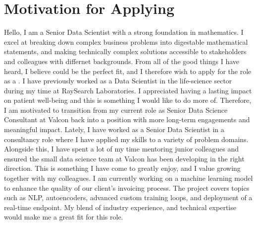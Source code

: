 \section{Motivation for Applying}
Hello, I am a Senior Data Scientist with a strong foundation in mathematics. I excel at breaking down complex business problems into digestable mathematical statements, and making technically complex solutions accessible to stakeholders and colleagues with differnet backgrounds. From all of the good things I have heard, I believe \company{} could be the perfect fit, and I therefore wish to apply for the role as a \role{}. \newpar I have previously worked as a Data Scientist in the life-science sector during my time at RaySearch Laboratories. I appreciated having a lasting impact on patient well-being and this is something I would like to do more of. Therefore, I am motivated to transition from my current role as Senior Data Science Consultant at Valcon back into a position with more long-term engagements and meaningful impact. \newpar Lately, I have worked as a Senior Data Scientist in a consultancy role where I have applied my skills to a variety of problem domains. Alongside this, I have spent a lot of my time mentoring junior colleagues and ensured the small data science team at Valcon has been developing in the right direction. This is something I have come to greatly enjoy, and I value growing together with my colleagues. \newpar I am currently working on a machine learning model to enhance the quality of our client's invoicing process.
The project covers topics such as NLP, autoencoders, advanced custom training loops, and deployment of a real-time endpoint. My blend of industry experience, and technical expertise would make me a great fit for this role.